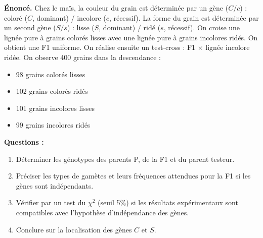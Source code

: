 \documentclass[11pt]{article}
\begin{document}
\begin{exoresolu}
\textbf{Énoncé.} Chez le maïs, la couleur du grain est déterminée par un gène ($C/c$) : coloré ($C$, dominant) / incolore ($c$, récessif). La forme du grain est déterminée par un second gène ($S/s$) : lisse ($S$, dominant) / ridé ($s$, récessif). On croise une lignée pure à grains colorés lisses avec une lignée pure à grains incolores ridés. On obtient une F1 uniforme. On réalise ensuite un test-cross : F1 $\times$ lignée incolore ridée. On observe 400 grains dans la descendance :
\begin{itemize}
    \item 98 grains colorés lisses
    \item 102 grains colorés ridés
    \item 101 grains incolores lisses
    \item 99 grains incolores ridés
\end{itemize}
\textbf{Questions :}
\begin{enumerate}
    \item Déterminer les génotypes des parents P, de la F1 et du parent testeur.
    \item Préciser les types de gamètes et leurs fréquences attendues pour la F1 si les gènes sont indépendants.
    \item Vérifier par un test du $\chi^2$ (seuil 5\%) si les résultats expérimentaux sont compatibles avec l'hypothèse d'indépendance des gènes.
    \item Conclure sur la localisation des gènes $C$ et $S$.
\end{enumerate}


\end{exoresolu}
\end{document}

